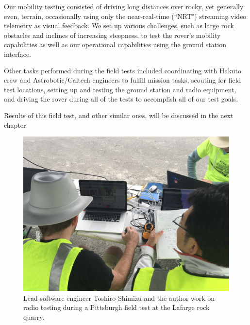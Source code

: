 Our mobility testing consisted of driving long distances over rocky, yet generally even, terrain, occasionally using only the near-real-time (``NRT") streaming video telemetry as visual feedback. We set up various challenges, such as large rock obstacles and inclines of increasing steepness, to test the rover's mobility capabilities as well as our operational capabilities using the ground station interface.

Other tasks performed during the field tests included coordinating with Hakuto crew and Astrobotic/Caltech engineers to fulfill mission tasks, scouting for field test locations, setting up and testing the ground station and radio equipment, and driving the rover during all of the tests to accomplish all of our test goals.

Results of this field test, and other similar ones, will be discussed in the next chapter.

\begin{figure}[h]
\centering
    \includegraphics[width=\columnwidth]{images/daytime_operation_pittsburgh_field_test.jpg}
    \caption{Lead software engineer Toshiro Shimizu and the author work on radio testing during a Pittsburgh field test at the Lafarge rock quarry.}
    \label{fig:daytime_operation_pittsburgh_field_test}
\end{figure}

